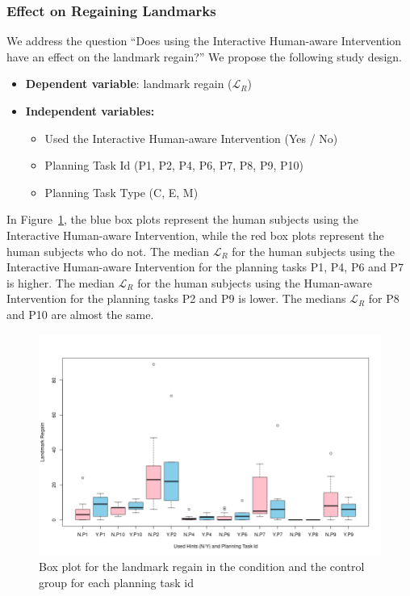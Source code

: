 \subsubsection{Effect on Regaining Landmarks}
We address the question ``Does using the Interactive Human-aware Intervention have an effect on the landmark regain?''
We propose the following study design.
\begin{itemize}
\item \textbf{Dependent variable}: landmark regain ($\mathcal{L}_R$)
\item \textbf{Independent variables:}
\begin{itemize}
\item Used the Interactive Human-aware Intervention (Yes / No)
\item Planning Task Id (P1, P2, P4, P6, P7, P8, P9, P10)
\item Planning Task Type (C, E, M)
\end{itemize}
\end{itemize}

In Figure~\ref{fig:regainbypid}, the blue box plots represent the human subjects using the Interactive Human-aware Intervention, while the red box plots represent the human subjects who do not.
The median $\mathcal{L}_R$ for the human subjects using the Interactive Human-aware Intervention for the planning tasks P1, P4, P6 and P7 is higher.
The median $\mathcal{L}_R$ for the human subjects using the Human-aware Intervention for the planning tasks P2 and P9 is lower.
The medians $\mathcal{L}_R$ for P8 and P10 are almost the same.

\begin{figure}[tpb]
  \centering
\includegraphics[width=\columnwidth]{img/regainbypid.png}
  \caption{Box plot for the landmark regain in the condition and the control group for each planning task id}
  \label{fig:regainbypid}
\end{figure}

